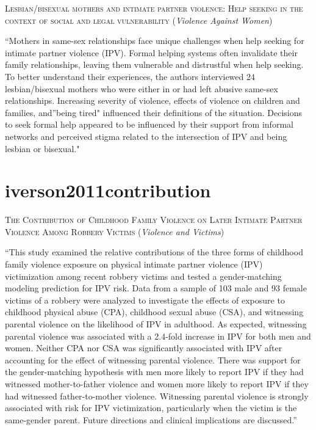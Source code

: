 \documentclass[]{tufte-handout}
\begin{document}
\textsc{\large{Lesbian/bisexual mothers and intimate partner violence: Help seeking in the context of social and legal vulnerability}}
(\emph{Violence Against Women})

``Mothers in same-sex relationships face unique challenges when help
seeking for intimate partner violence (IPV). Formal helping systems
often invalidate their family relationships, leaving them vulnerable and
distrustful when help seeking. To better understand their experiences,
the authors interviewed 24 lesbian/bisexual mothers who were either in
or had left abusive same-sex relationships. Increasing severity of
violence, effects of violence on children and families, and''being
tired" influenced their definitions of the situation. Decisions to seek
formal help appeared to be influenced by their support from informal
networks and perceived stigma related to the intersection of IPV and
being lesbian or bisexual."

\section{\texorpdfstring{\textcolor[HTML]{5b0057}{iverson2011contribution}}{}}\label{section-45}

\textsc{\large{The Contribution of Childhood Family Violence on Later Intimate Partner Violence Among Robbery Victims}}
(\emph{Violence and Victims})

``This study examined the relative contributions of the three forms of
childhood family violence exposure on physical intimate partner violence
(IPV) victimization among recent robbery victims and tested a
gender-matching modeling prediction for IPV risk. Data from a sample of
103 male and 93 female victims of a robbery were analyzed to investigate
the effects of exposure to childhood physical abuse (CPA), childhood
sexual abuse (CSA), and witnessing parental violence on the likelihood
of IPV in adulthood. As expected, witnessing parental violence was
associated with a 2.4-fold increase in IPV for both men and women.
Neither CPA nor CSA was significantly associated with IPV after
accounting for the effect of witnessing parental violence. There was
support for the gender-matching hypothesis with men more likely to
report IPV if they had witnessed mother-to-father violence and women
more likely to report IPV if they had witnessed father-to-mother
violence. Witnessing parental violence is strongly associated with risk
for IPV victimization, particularly when the victim is the same-gender
parent. Future directions and clinical implications are discussed.''
\end{document}
